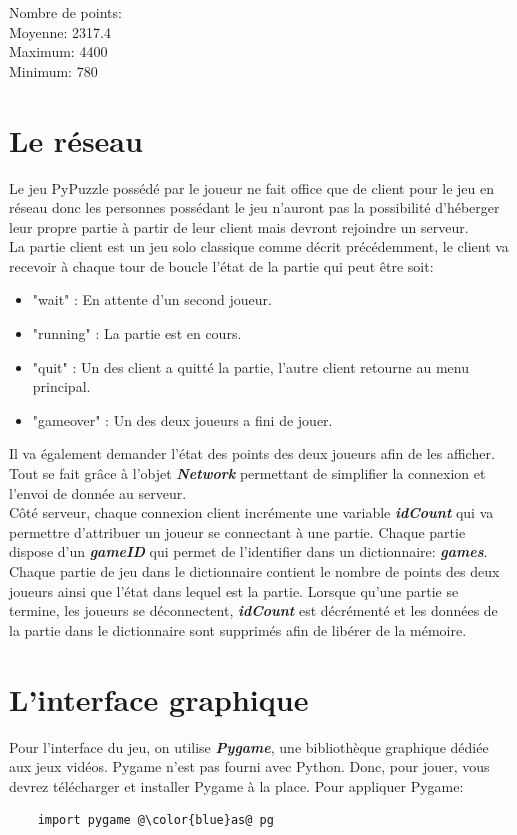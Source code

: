 \documentclass[a4paper]{report}
\begin{document}
Nombre de points:\\
Moyenne: 2317.4\\
Maximum: 4400\\
Minimum: 780\\


\section{Le réseau}
Le jeu PyPuzzle possédé par le joueur ne fait office que de client pour le jeu en réseau donc les personnes possédant le jeu n'auront pas la possibilité d'héberger leur propre partie à partir de leur client mais devront rejoindre un serveur. \\

La partie client est un jeu solo classique comme décrit précédemment, le client va recevoir à chaque tour de boucle l'état de la partie qui peut être soit:
\begin{itemize}
	\item "wait" : En attente d'un second joueur.
	\item "running" : La partie est en cours.
	\item "quit" : Un des client a quitté la partie, l'autre client retourne au menu principal.
	\item "gameover" : Un des deux joueurs a fini de jouer.
\end{itemize}
Il va également demander l'état des points des deux joueurs afin de les afficher. Tout se fait grâce à l'objet \textbf{\textit{Network}} permettant de simplifier la connexion et l'envoi de donnée au serveur.\\

Côté serveur, chaque connexion client incrémente une variable \textbf{\textit{idCount}} qui va permettre d'attribuer un joueur se connectant à une partie. Chaque partie dispose d'un \textbf{\textit{gameID}} qui permet de l'identifier dans un dictionnaire: \textbf{\textit{games}}. Chaque partie de jeu dans le dictionnaire contient le nombre de points des deux joueurs ainsi que l'état dans lequel est la partie. Lorsque qu'une partie se termine, les joueurs se déconnectent, \textbf{\textit{idCount}} est décrémenté et les données de la partie dans le dictionnaire sont supprimés afin de libérer de la mémoire.


\section{L'interface graphique}
Pour l'interface du jeu, on utilise \textbf{\textit{Pygame}}, une bibliothèque graphique dédiée aux jeux vidéos. 
Pygame n'est pas fourni avec Python. Donc, pour jouer, vous devrez télécharger et installer Pygame à la place. Pour appliquer Pygame:
\begin{lstlisting}
    import pygame @\color{blue}as@ pg
\end{lstlisting}
\end{document}
